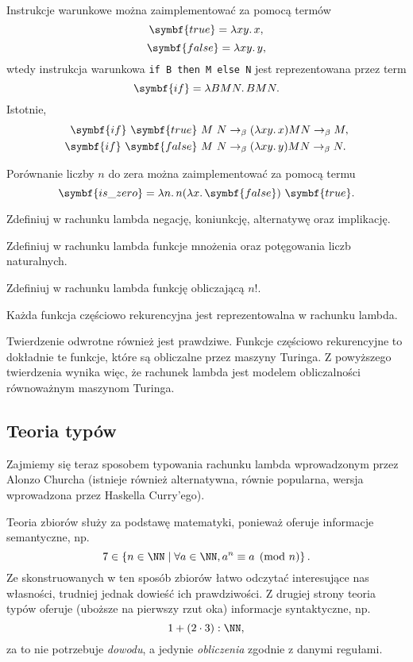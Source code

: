 \documentclass[polish,pretty]{angav}
\begin{document}
Instrukcje warunkowe można zaimplementować za pomocą termów
\[ \symbf{true} = \lambda xy\ldotp x, \]
\[ \symbf{false} = \lambda xy\ldotp y, \]
wtedy instrukcja warunkowa \texttt{if B then M else N} jest reprezentowana przez term
\[ \symbf{if} = \lambda B M N\ldotp B M N. \]
Istotnie,
\begin{align*}
    \symbf{if}\ \symbf{true}\ M\ N &\to_\beta (\lambda xy\ldotp x) M N \to_\beta M, \\
    \symbf{if}\ \symbf{false}\ M\ N &\to_\beta (\lambda xy\ldotp y) M N \to_\beta N.
\end{align*}

Porównanie liczby $n$ do zera można zaimplementować za pomocą termu
\[ \symbf{is\_zero} = \lambda n\ldotp n (\lambda x\ldotp \symbf{false})\ \symbf{true}. \]

\begin{problem}
    Zdefiniuj w rachunku lambda negację, koniunkcję, alternatywę oraz implikację.
\end{problem}

\begin{problem}
    Zdefiniuj w rachunku lambda funkcje mnożenia oraz potęgowania liczb naturalnych.
\end{problem}

\begin{problem}
    Zdefiniuj w rachunku lambda funkcję obliczającą $n!$.
\end{problem}

\begin{theorem}[Kleene'a]
    Każda funkcja częściowo rekurencyjna jest reprezentowalna w rachunku lambda.
\end{theorem}
Twierdzenie odwrotne również jest prawdziwe. Funkcje częściowo rekurencyjne to dokładnie te funkcje, które są obliczalne przez maszyny Turinga. Z powyższego twierdzenia wynika więc, że rachunek lambda jest modelem obliczalności równoważnym maszynom Turinga.

\subsection{Teoria typów}

Zajmiemy się teraz sposobem typowania rachunku lambda wprowadzonym przez Alonzo Churcha (istnieje również alternatywna, równie popularna, wersja wprowadzona przez Haskella Curry'ego).



Teoria zbiorów służy za podstawę matematyki, ponieważ oferuje informacje semantyczne, np.
\[ 7 \in \left\{n \in \NN \mid \forall a \in \NN, a^n \equiv a \pmod{n} \right\}. \]
Ze skonstruowanych w ten sposób zbiorów łatwo odczytać interesujące nas własności, trudniej jednak dowieść ich prawdziwości.
Z drugiej strony teoria typów oferuje (uboższe na pierwszy rzut oka) informacje syntaktyczne, np.
\[ 1 + (2 \cdot 3) : \NN, \]
za to nie potrzebuje \emph{dowodu}, a jedynie \emph{obliczenia} zgodnie z danymi regułami.
\end{document}
